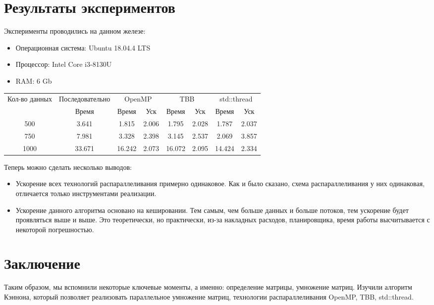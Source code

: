 \documentclass{report}
\begin{document}
\section{\hspace{0.6cm}Результаты экспериментов}
Эксперименты проводились на данном железе:
\begin{itemize}
\item Операционная система: Ubuntu 18.04.4 LTS
\item Процессор: Intel Core i3-8130U
\item RAM: 6 Gb
\end{itemize}
\vspace{3em}
\begin{tabular}{ |c|c|c|c|c|c|c|c|}
\hline
\multirow{2}{*}{Кол-во данных} & Последовательно & \multicolumn{2}{c|}{OpenMP} & \multicolumn{2}{c|}{TBB} & \multicolumn{2}{c|}{std::thread} \\ \cline{2-8} 
     & Время & Время & Уск & Время & Уск & Время & Уск \\ \hline
500  &  3.641 & 1.815 & 2.006 & 1.795 &2.028 & 1.787 & 2.037   \\
750 & 7.981 & 3.328 & 2.398 & 3.145 & 2.537 & 2.069 & 3.857 \\
1000 & 33.671 & 16.242 & 2.073 & 16.072 & 2.095 & 14.424 & 2.334 \\
\hline
\end{tabular}

Теперь можно сделать несколько выводов:
\begin{itemize}
\item Ускорение всех технологий распараллеливания примерно одинаковое. Как и было сказано, схема распараллеливания у них одинаковая, отличается только инструментами реализации.
\item  Ускорение данного алгоритма основано на кешировании. Тем самым, чем больше данных и больше потоков, тем ускорение будет проявляться выше и выше. Это теоретически, но практически, из-за накладных расходов, планировщика, время работы высчитывается с некоторой погрешностью.
\end{itemize}

\newpage

\section{\hspace{0.6cm}Заключение}
Таким образом, мы вспомнили некоторые ключевые моменты, а именно: определение матрицы, умножение матриц. Изучили алгоритм Кэннона, который позволяет реализовать параллельное умножение матриц, технологии распараллеливания OpenMP, TBB, std::thread.
\end{document}
